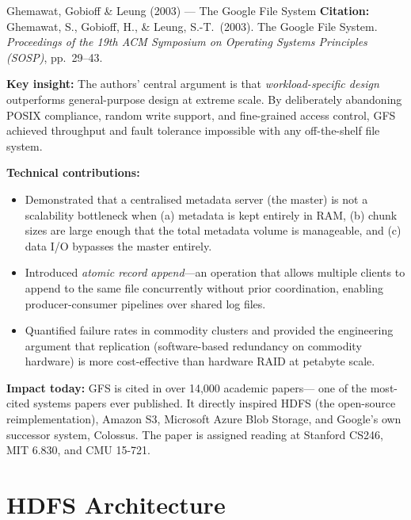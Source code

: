 \begin{researchspotlight}{Ghemawat, Gobioff \& Leung (2003) --- The Google File System}
\textbf{Citation:} Ghemawat, S., Gobioff, H., \& Leung, S.-T.\ (2003).
The Google File System. \textit{Proceedings of the 19th ACM Symposium
on Operating Systems Principles (SOSP)}, pp.\ 29--43.
\parencite{GFS2003}

\smallskip\noindent
\textbf{Key insight:} The authors' central argument is that
\emph{workload-specific design} outperforms general-purpose design at
extreme scale. By deliberately abandoning POSIX compliance, random
write support, and fine-grained access control, GFS achieved
throughput and fault tolerance impossible with any off-the-shelf
file system.

\smallskip\noindent
\textbf{Technical contributions:}
\begin{itemize}
  \item Demonstrated that a centralised metadata server (the master)
        is not a scalability bottleneck when (a) metadata is kept
        entirely in RAM, (b) chunk sizes are large enough that the
        total metadata volume is manageable, and (c) data I/O bypasses
        the master entirely.
  \item Introduced \emph{atomic record append}---an operation that
        allows multiple clients to append to the same file
        concurrently without prior coordination, enabling
        producer-consumer pipelines over shared log files.
  \item Quantified failure rates in commodity clusters and provided
        the engineering argument that replication (software-based
        redundancy on commodity hardware) is more cost-effective than
        hardware RAID at petabyte scale.
\end{itemize}

\smallskip\noindent
\textbf{Impact today:} GFS is cited in over 14,000 academic papers---
one of the most-cited systems papers ever published. It directly
inspired HDFS (the open-source reimplementation), Amazon S3, Microsoft
Azure Blob Storage, and Google's own successor system, Colossus.
The paper is assigned reading at Stanford CS246, MIT 6.830, and CMU
15-721.
\end{researchspotlight}

\section{HDFS Architecture}
\label{sec:hdfs-arch}

